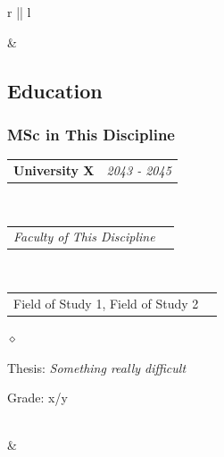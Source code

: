 \documentclass[a4paper]{article}
\makeatletter
\newlength{\sectsep}
\newlength{\subsectsep}
\newcommand{\headerrow}[2]
{\begin{tabular*}{\textwidth}{l@{\extracolsep{\fill}}r}
	#1 &
	#2 \\
\end{tabular*}}
\renewenvironment{itemize}{
  \begin{list}{$\diamond$}{
    \setlength{\topsep}{0.25em}
    \setlength{\itemsep}{0em}
    \setlength{\parskip}{0pt}
    \setlength{\parsep}{0em}
  }
}{
  \end{list}
}
\makeatother
\begin{document}
\begin{longtable}{r || l}

  & \begin{minipage}{0.9\textwidth}
      \vspace{\sectsep}
      \subsection*{Education}
      \subsubsection*{MSc in This Discipline}
      \headerrow
  		{\textbf{University X}}{\emph{2043 - 2045}}
      \\
      \headerrow
        {\emph{Faculty of This Discipline}}{}
      \\
      \headerrow
        {Field of Study 1, Field of Study 2}{}

      \begin{itemize}
          \item Thesis: \emph{Something really difficult}
          \item Grade: x/y
      \end{itemize}
  \end{minipage} \\[\sectsep]

  & \begin{minipage}{0.9\textwidth}
      \vspace{\subsectsep}

\end{minipage}
\end{longtable}
\end{document}
